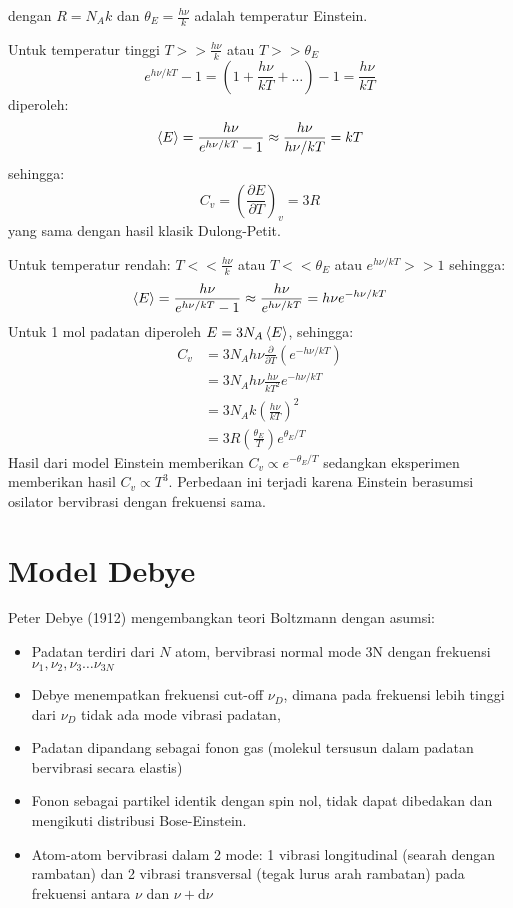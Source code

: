dengan $R = N_{A}k$ dan $\theta_{E} = \frac{h\nu}{k}$ adalah temperatur Einstein.

Untuk temperatur tinggi $T >> \frac{h\nu}{k}$ atau $T >> \theta_{E}$
\begin{equation*}
e^{h\nu/kT} - 1 = \left( 1 + \frac{h\nu}{kT} + \ldots \right) - 1 = \frac{h\nu}{kT}
\end{equation*}
diperoleh:
\begin{equation*}
\braket{E} = \frac{h\nu}{e^{h\nu/kT} - 1} \approx \frac{h\nu}{h\nu/kT} = kT
\end{equation*}
sehingga:
\begin{equation*}
C_{v} = \left( \frac{\partial E}{\partial T} \right)_{v} = 3R
\end{equation*}
yang sama dengan hasil klasik Dulong-Petit.


Untuk temperatur rendah: $T << \frac{h\nu}{k}$ atau $T << \theta_{E}$
atau $e^{h\nu/kT} >> 1$ sehingga:
\begin{equation*}
\braket{E} = \frac{h\nu}{e^{h\nu/kT} - 1} \approx \frac{h\nu}{e^{h\nu/kT}} =
h\nu e^{-h\nu/kT}
\end{equation*}
Untuk 1 mol padatan diperoleh $E = 3N_{A}\braket{E}$, sehingga:
\begin{align*}
C_{v} & = 3N_{A} h\nu \frac{\partial}{\partial T}\left(
e^{-h\nu/kT} \right) \\
& = 3N_{A} h\nu \frac{h\nu}{kT^2} e^{-h\nu/kT} \\
& = 3N_{A} k \left( \frac{h\nu}{kT} \right)^2 \\
& = 3R \left( \frac{\theta_{E}}{T} \right) e^{\theta_{E}/T}
\end{align*}
Hasil dari model Einstein memberikan  $C_{v} \propto e^{-\theta_{E}/T}$
sedangkan eksperimen memberikan hasil $C_{v} \propto T^{3}$.
Perbedaan ini terjadi karena Einstein berasumsi osilator bervibrasi dengan frekuensi sama.

\section{Model Debye}

Peter Debye (1912) mengembangkan teori Boltzmann dengan asumsi:
\begin{itemize}
\item Padatan terdiri dari $N$ atom, bervibrasi normal mode 3N dengan frekuensi
$\nu_{1}, \nu_{2}, \nu_{3} \ldots \nu_{3N}$
\item Debye menempatkan frekuensi cut-off $\nu_{D}$, dimana pada frekuensi lebih
tinggi dari $\nu_{D}$ tidak ada mode vibrasi padatan,
\item Padatan dipandang sebagai fonon gas (molekul tersusun dalam padatan bervibrasi secara elastis)
\item Fonon sebagai partikel identik dengan spin nol,
tidak dapat dibedakan dan mengikuti distribusi Bose-Einstein.
\item Atom-atom bervibrasi dalam 2 mode: 1 vibrasi longitudinal (searah dengan rambatan) dan 2 vibrasi
transversal (tegak lurus arah rambatan) pada frekuensi antara $\nu$ dan $\nu + \mathrm{d}\nu$
\end{itemize}





